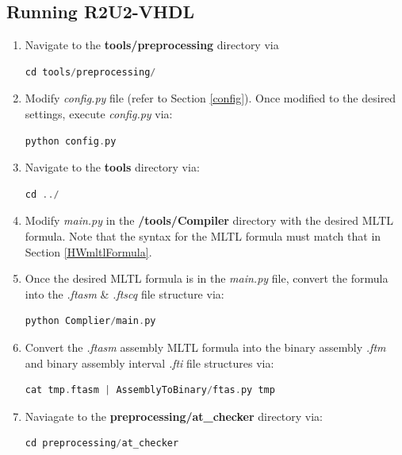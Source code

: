 \subsection{Running R2U2-VHDL}
\label{runR2U2}
\begin{enumerate}
	\item Navigate to the \textbf{tools/preprocessing} directory via
	\begin{lstlisting}[language=C]
	cd tools/preprocessing/
	\end{lstlisting}
	
	\item Modify \textit{config.py} file (refer to Section \ref{config}). Once modified to the desired settings, execute \textit{config.py} via:
	\begin{lstlisting}[language=C]
	python config.py
	\end{lstlisting}
	
	\item Navigate to the \textbf{tools} directory via:
	\begin{lstlisting}[language=C]
	cd ../
	\end{lstlisting}
	
	\item Modify \textit{main.py} in the \textbf{/tools/Compiler} directory with the desired MLTL formula. Note that the syntax for the MLTL formula must match that in Section \ref{HWmltlFormula}.
	
	\item Once the desired MLTL formula is in the \textit{main.py} file, convert the formula into the \textit{.ftasm} \& \textit{.ftscq} file structure via:
	\begin{lstlisting}[language=C]
	python Complier/main.py
	\end{lstlisting}
	
	\item Convert the \textit{.ftasm} assembly MLTL formula into the binary assembly \textit{.ftm} and binary assembly interval \textit{.fti} file structures via: 
	\begin{lstlisting}[language=C]
	cat tmp.ftasm | AssemblyToBinary/ftas.py tmp
	\end{lstlisting}
	
	\item Naviagate to the \textbf{preprocessing/at\_checker} directory via: 
	\begin{lstlisting}[language=C]
	cd preprocessing/at_checker
	\end{lstlisting}
	

\end{enumerate}
